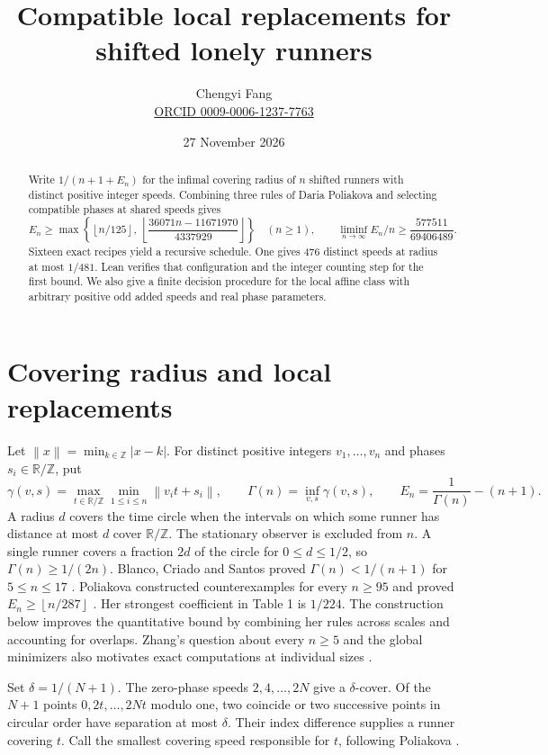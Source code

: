 \documentclass[11pt]{article}
\title{Compatible local replacements for shifted lonely runners}
\author{Chengyi Fang\\[-2pt]\small
\href{https://orcid.org/0009-0006-1237-7763}{ORCID 0009-0006-1237-7763}}
\date{27 November 2026}
\theoremstyle{definition}
\newcommand{\T}{\mathbb{R}/\mathbb{Z}}
\newcommand{\Z}{\mathbb{Z}}
\newcommand{\norm}[1]{\left\lVert #1\right\rVert}
\newcommand{\fl}[1]{\left\lfloor #1\right\rfloor}
\begin{document}
\maketitle
\begin{abstract}
Write \(1/(n+1+E_n)\) for the infimal covering radius of \(n\) shifted
runners with distinct positive integer speeds. Combining three rules of
Daria Poliakova and selecting compatible phases at shared speeds gives
\[
 E_n\ge\max\left\{\fl{n/125},\
          \fl{\frac{36071n-11671970}{4337929}}\right\}
 \quad(n\ge1),\qquad
 \liminf_{n\to\infty} E_n/n\ge\frac{577511}{69406489}.
\]
Sixteen exact recipes yield a recursive schedule.
One gives 476 distinct speeds at radius at most \(1/481\).
Lean verifies that configuration and the integer counting step for the
first bound. We also give a finite decision procedure for the local
affine class with arbitrary positive odd added speeds and real phase parameters.
\end{abstract}

\section{Covering radius and local replacements}

Let \(\norm{x}=\min_{k\in\Z}|x-k|\). For distinct positive integers
\(v_1,\ldots,v_n\) and phases \(s_i\in\T\), put
\[
 \gamma(v,s)=\max_{t\in\T}\min_{1\le i\le n}\norm{v_it+s_i},
 \qquad \Gamma(n)=\inf_{v,s}\gamma(v,s),
 \qquad E_n=\frac1{\Gamma(n)}-(n+1).
\]
A radius \(d\) covers the time circle when the intervals on which some
runner has distance at most \(d\) cover \(\T\). The stationary observer
is excluded from \(n\). A single runner covers a fraction \(2d\) of the
circle for \(0\le d\le 1/2\), so \(\Gamma(n)\ge 1/(2n)\).
Blanco, Criado and Santos proved \(\Gamma(n)<1/(n+1)\) for
\(5\le n\le17\) \cite[Theorem 1.8]{BCS}. Poliakova constructed
counterexamples for every \(n\ge95\) and proved \(E_n\ge\fl{n/287}\)
\cite[Theorems 1 and 2]{Poliakova}. Her strongest coefficient in
Table 1 is \(1/224\). The construction below improves the quantitative
bound by combining her rules across scales and accounting for overlaps.
Zhang's question about every \(n\ge5\) and the global minimizers
\cite[Question 8.5]{Zhang} also motivates exact computations at
individual sizes \cite{Upstream}.

Set \(\delta=1/(N+1)\). The zero-phase speeds \(2,4,\ldots,2N\) give
a \(\delta\)-cover. Of the \(N+1\) points \(0,2t,\ldots,2Nt\) modulo
one, two coincide or two successive points in circular order have
separation at most \(\delta\). Their index difference supplies a runner
covering \(t\). Call the smallest covering speed responsible for \(t\),
following Poliakova \cite[Definition 5]{Poliakova}.
\end{document}
